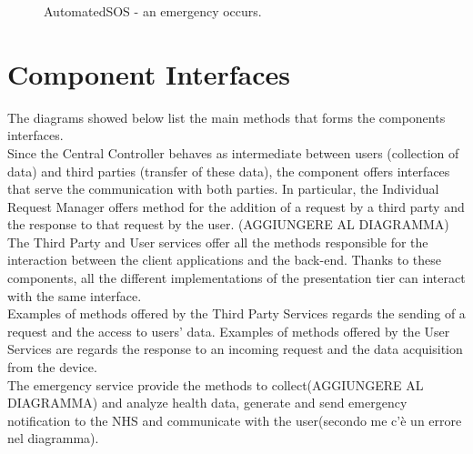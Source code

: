 \begin{figure}[ht]
    \caption{AutomatedSOS - an emergency occurs.}
    \label{RV11}
\end{figure}

\clearpage
\section{Component Interfaces}
The diagrams showed below list the main methods that forms the components interfaces.\\

Since the Central Controller behaves as intermediate between users (collection of data) and third parties (transfer of these data), the component offers interfaces that serve the communication with both parties.
In particular, the Individual Request Manager offers method for the addition of a request by a third party and the response to that request by the user. (AGGIUNGERE AL DIAGRAMMA)\\

The Third Party and User services offer all the methods responsible for the interaction between the client applications and the back-end. Thanks to these components, all the different implementations of the presentation tier can interact with the same interface.\\
Examples of methods offered by the Third Party Services regards the sending of a request and the access to users' data. Examples of methods offered by the User Services are regards the response to an incoming request and the data acquisition from the device.\\

The emergency service provide the methods to collect(AGGIUNGERE AL DIAGRAMMA) and analyze health data, generate and send emergency notification to the NHS and communicate with the user(secondo me c'è un errore nel diagramma).\\
\clearpage

